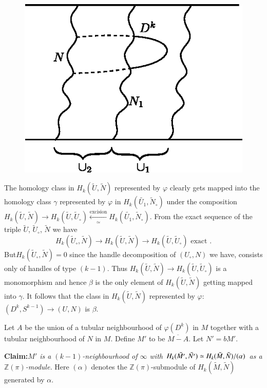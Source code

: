 \begin{figure}[H]
\centering
\includegraphics{vol46-fig/fig46-7.eps}
\end{figure}

The homology class in $H_k (\tilde{U},
\tilde{N})$ represented by $\varphi$ clearly gets ma\-pped into the
homology class $\gamma$ represented by $\varphi$ in $H_k (\tilde{U_1},
\tilde{N}_\circ)$ under the composition $H_k (\tilde{U}, \tilde{N}) \to H_k
(\tilde{U}, \tilde{U}_\circ) \xleftarrow[ \simeq]{\text{excision}} H_k
(\tilde{U_1}, \tilde{N}_\circ)$. From the exact sequence of the triple
$\tilde{U}$, $\tilde{U}_\circ$, $\tilde{N}$ we have 
$$
H_k (\tilde{U}_\circ, \tilde{N}) \to H_k (\tilde{U}, \tilde{N})\to H_k
(\tilde{U}, \tilde{U}_\circ) \text{ exact }. 
$$
But\pageoriginale $H_k (\tilde{U}_\circ, \tilde{N}) = 0$ since the handle
decomposition 
of $( U_\circ, N)$ we have, consists only of handles of type $ (k-1)
$. Thus $H_k (\tilde{U}, \tilde{N}) \to H_k (\tilde{U}, \tilde{U}_\circ)$
is a monomorphism and hence $\beta$ is the only element of $H_k
(\tilde{U}, \tilde{N})$ getting mapped into $\gamma$. It follows that
the class in $H_k (\tilde{U}, \tilde{N})$ represented by $\varphi$:
$(D^k, S^{k-1}) \to (U,N)$ is $\beta$. 

Let $A$ be the union of a tubular neighbourhood of $\varphi (D^k)$ in $M$
together with a tubular neighbourhood of $N$ in $M$. Define $M'$ to be
$\overline{M-A}$. Let $N'=bM'$. 

\noindent
\textbf{Claim:}\textit{$M'$ is a $(k-1)$-neighbourhood of $\infty$
  with $H_k(\tilde{M'}, \tilde{N'})\simeq H_k (\tilde{M},\break \tilde{N})/
  (\alpha)$ as a $\mathbb{Z}(\pi)$-module.} Here $(\alpha)$ denotes
the $\mathbb{Z}(\pi)$-submodule of $H_k (\tilde{M}, \tilde{N})$
generated by $\alpha$. 

